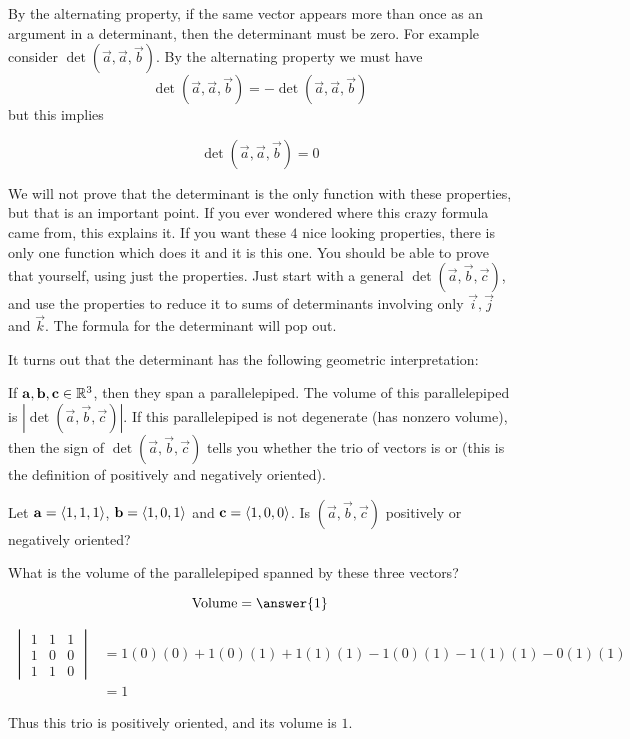 \documentclass{ximera}
\begin{document}
\begin{observation}
  By the alternating property, if the same vector appears more than
  once as an argument in a determinant, then the determinant must be
  zero.  For example consider $\det(\vec{a},\vec{a},\vec{b})$. By the
  alternating property we must have
  \[
  \det(\vec{a},\vec{a},\vec{b}) = -\det(\vec{a},\vec{a},\vec{b})
  \]
  but this implies 
  
  \[
  \det(\vec{a},\vec{a},\vec{b})=0
  \]
\end{observation}
	
We will not prove that the determinant is the only function with these
properties, but that is an important point.  If you ever wondered
where this crazy formula came from, this explains it.  If you want
these $4$ nice looking properties, there is only one function which
does it and it is this one.  You should be able to prove that
yourself, using just the properties.  Just start with a general
$\det(\vec{a},\vec{b},\vec{c}) $, and use the properties to reduce it
to sums of determinants involving only $\vec{i},\vec{j}$ and
$\vec{k}$.  The formula for the determinant will pop out.
	
It turns out that the determinant has the following geometric
interpretation:
\begin{theorem}
  If $\mathbf{a},\mathbf{b},\mathbf{c} \in \mathbb R^3$, then they span a
  parallelepiped. The volume of this parallelepiped is
  $\left|\det(\vec{a},\vec{b},\vec{c})\right|$. If this parallelepiped
  is not degenerate (has nonzero volume), then the sign of
  $\det(\vec{a},\vec{b},\vec{c})$ tells you whether the trio of
  vectors is  or 
  (this is the definition of positively and negatively oriented).
\end{theorem} 
	
\begin{question}
  Let $\mathbf{a} = \left\langle 1,1,1\right\rangle$, $\mathbf{b} = \left\langle 1,0,1\right\rangle$ and
  $\mathbf{c} = \left\langle 1,0,0\right\rangle$.  Is $(\vec{a},\vec{b},\vec{c})$
  positively or negatively oriented?
  \begin{multipleChoice}
  \end{multipleChoice}
		
  What is the volume of the parallelepiped spanned by these three vectors?
  
  \[
  \textrm{Volume} = \answer{1}
  \]
  
  \begin{hint}
    \begin{align*}
      \begin{vmatrix}
	1 & 1 & 1\\
	1 & 0 & 0\\
	1 & 1 & 0
      \end{vmatrix} &=
      1(0)(0)+1(0)(1)+1(1)(1)-1(0)(1)-1(1)(1)-0(1)(1)\\
      &=1
    \end{align*}
    
    Thus this trio is positively oriented, and its volume is $1$.
  \end{hint}
\end{question}
\end{document}
